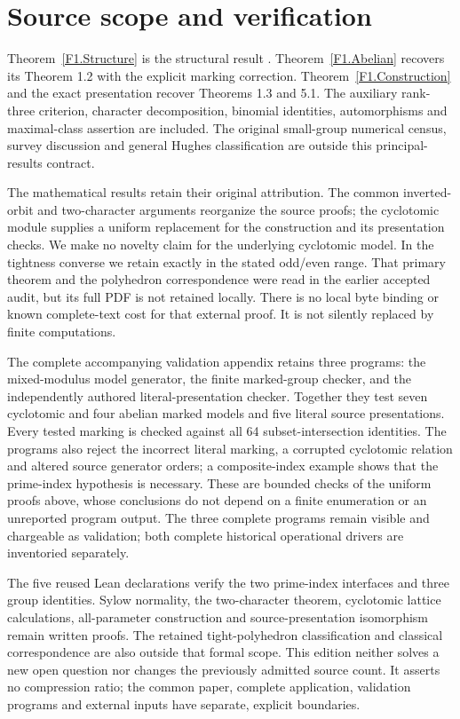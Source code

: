 \section{Source scope and verification}
Theorem~\ref{F1.Structure} is the structural result
\cite[Theorem 1.1]{HFLQ}. Theorem~\ref{F1.Abelian} recovers its
Theorem 1.2 with the explicit marking correction. Theorem~\ref{F1.Construction}
and the exact presentation recover Theorems 1.3 and 5.1. The auxiliary
rank-three criterion, character decomposition, binomial identities,
automorphisms and maximal-class assertion are included. The original
small-group numerical census, survey discussion and general Hughes
classification are outside this principal-results contract.

The mathematical results retain their original attribution. The common
inverted-orbit and two-character arguments reorganize the source proofs;
the cyclotomic module supplies a uniform replacement for the construction
and its presentation checks. We make no novelty claim for the underlying
cyclotomic model. In the tightness converse we retain exactly
\cite[Theorem 1.1(b),(c)]{CP} in the stated odd/even range. That
primary theorem and the polyhedron correspondence were read in the
earlier accepted audit, but its full PDF is not retained locally.
There is no local byte binding or known complete-text cost for that
external proof. It is not silently replaced by finite computations.

The complete accompanying validation appendix retains three programs:
the mixed-modulus model generator, the finite marked-group checker,
and the independently authored literal-presentation checker. Together
they test seven cyclotomic and four abelian marked models and five
literal source presentations. Every tested marking is checked against
all 64 subset-intersection identities. The programs also reject the
incorrect literal marking, a corrupted cyclotomic relation and altered
source generator orders; a composite-index example shows that the
prime-index hypothesis is necessary. These are bounded checks of the
uniform proofs above, whose conclusions do not depend on a finite
enumeration or an unreported program output. The three complete
programs remain visible and chargeable as validation; both complete
historical operational drivers are inventoried separately.

The five reused Lean declarations verify the two prime-index interfaces
and three group identities. Sylow normality, the two-character theorem,
cyclotomic lattice calculations, all-parameter construction and
source-presentation isomorphism remain written proofs. The retained
tight-polyhedron classification and classical correspondence are also
outside that formal scope. This edition neither solves a new open
question nor changes the previously admitted source count. It asserts
no compression ratio; the common paper, complete application, validation
programs and external inputs have separate, explicit boundaries.
